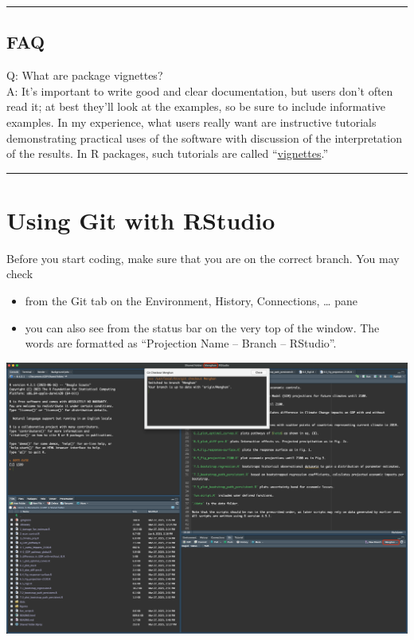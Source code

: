 \documentclass[
  a4paper,
  twoside,
  openright]{book}
\providecommand{\tightlist}{%
  \setlength{\itemsep}{0pt}\setlength{\parskip}{0pt}}
\theoremstyle{definition}
\theoremstyle{definition}
\theoremstyle{definition}
\theoremstyle{definition}
\theoremstyle{remark}
\begin{document}
\begin{center}\rule{0.5\linewidth}{0.5pt}\end{center}

\subsection*{FAQ}\label{faq}

Q: What are package vignettes?\\
A: It's important to write good and clear documentation, but users don't often read it; at best they'll look at the examples, so be sure to include informative examples. In my experience, what users really want are instructive tutorials demonstrating practical uses of the software with discussion of the interpretation of the results. In R packages, such tutorials are called ``\href{https://kbroman.org/pkg_primer/pages/vignettes.html}{vignettes}.''

\begin{center}\rule{0.5\linewidth}{0.5pt}\end{center}

\section{Using Git with RStudio}\label{using-git-with-rstudio}

Before you start coding, make sure that you are on the correct branch. You may check

\begin{itemize}
\tightlist
\item
  from the Git tab on the Environment, History, Connections, \ldots{} pane
\item
  you can also see from the status bar on the very top of the window. The words are formatted as ``Projection Name -- Branch -- RStudio''.
\end{itemize}

\includegraphics[width=1\linewidth]{images/R git branch}
\end{document}

